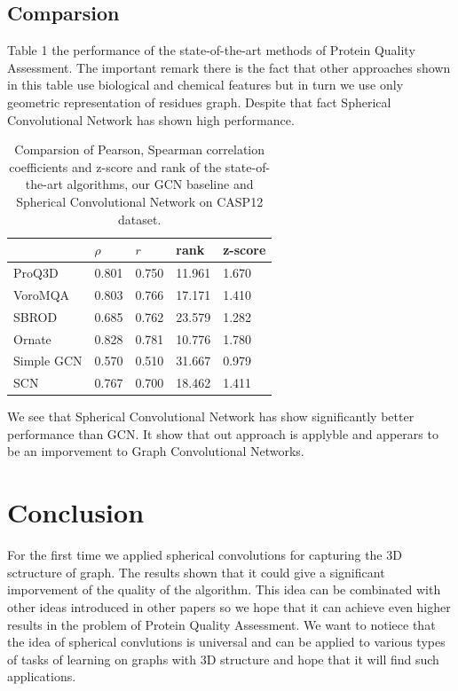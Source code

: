\documentclass[12pt,twoside]{article}
\begin{document}
	\subsection{Comparsion}
	Table 1 the performance of the state-of-the-art methods of Protein Quality Assessment. The important remark there is
	the fact that other approaches shown in this table use biological and chemical features but in turn we use only geometric representation
	of residues graph. Despite that fact Spherical Convolutional Network has shown high performance.
	\begin{center}
		\begin{table}[H]
			\centering
			\begin{tabular}{l|l|l|l|l}
				\hline
					   & $\rho$ &  $r$     &   rank       & z-score \\ \hline
			ProQ3D     & 0.801  &  0.750   &   11.961     & 1.670       \\
			VoroMQA    & 0.803  &  0.766   &   17.171     & 1.410       \\  
			SBROD      & 0.685  &  0.762   &   23.579     & 1.282       \\
			Ornate     & 0.828  &  0.781   &   10.776     & 1.780       \\
			Simple GCN & 0.570  &  0.510   &   31.667     & 0.979       \\
			SCN        & 0.767  &  0.700   &   18.462     & 1.411       
		\end{tabular}
		\caption{Comparsion of Pearson, Spearman correlation coefficients and z-score and rank of the state-of-the-art algorithms,
			our GCN baseline and Spherical Convolutional Network on CASP12 dataset.
			}
		\label{Tab:1}
		\end{table}
	\end{center}

	We see that Spherical Convolutional Network has show significantly better performance than GCN. It show that out approach
	is applyble and apperars to be an imporvement to Graph Convolutional Networks.

	\section{Conclusion}
	For the first time we applied spherical convolutions for capturing the 3D sctructure of graph. The results shown that it could
	give a significant imporvement of the quality of the algorithm. This idea can be combinated with other ideas introduced in other papers
	\cite{Pages2019}\cite{Baldassarre2020GRAPHQAPM}\cite{Uziela2016} so we hope that it can achieve even higher results in the problem
	of Protein Quality Assessment. We want to notiece that the idea of spherical convlutions is universal and can be applied to
	various types of tasks of learning on graphs with 3D structure and hope that it will find such applications.
\end{document}
